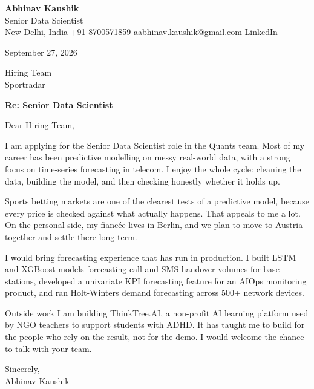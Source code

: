 \documentclass[11pt,a4paper]{article}
\begin{document}
{\Large\bfseries Abhinav Kaushik}\\
Senior Data Scientist\\
New Delhi, India \textbar{} +91 8700571859 \textbar{} \href{mailto:aabhinav.kaushik@gmail.com}{aabhinav.kaushik@gmail.com} \textbar{} \href{https://www.linkedin.com/in/abhinav-kaushik10/}{LinkedIn}  

September 27, 2026

Hiring Team\\
Sportradar

\textbf{Re: Senior Data Scientist}

Dear Hiring Team,

I am applying for the Senior Data Scientist role in the Quants team. Most of my career has been predictive modelling on messy real-world data, with a strong focus on time-series forecasting in telecom. I enjoy the whole cycle: cleaning the data, building the model, and then checking honestly whether it holds up.

Sports betting markets are one of the clearest tests of a predictive model, because every price is checked against what actually happens. That appeals to me a lot. On the personal side, my fiancée lives in Berlin, and we plan to move to Austria together and settle there long term.

I would bring forecasting experience that has run in production. I built LSTM and XGBoost models forecasting call and SMS handover volumes for base stations, developed a univariate KPI forecasting feature for an AIOps monitoring product, and ran Holt-Winters demand forecasting across 500+ network devices.

Outside work I am building ThinkTree.AI, a non-profit AI learning platform used by NGO teachers to support students with ADHD. It has taught me to build for the people who rely on the result, not for the demo. I would welcome the chance to talk with your team.

Sincerely,\\[4pt]
Abhinav Kaushik
\end{document}
